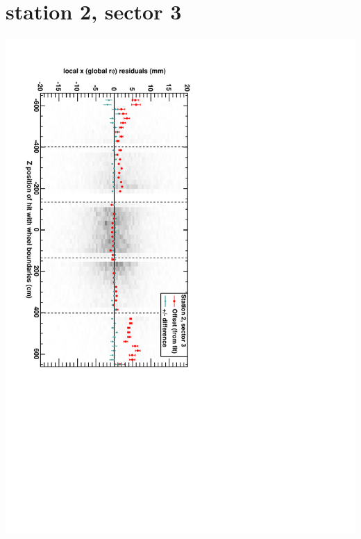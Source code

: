 \documentclass[compress]{beamer}
\begin{document}
\section*{station 2, sector 3}
\begin{frame} \vfill \mbox{\hspace{-1 cm}\includegraphics[height=1.2\linewidth, angle=90]{DTrphiVsZ_st2_sr03.pdf}} \end{frame}
\end{document}

